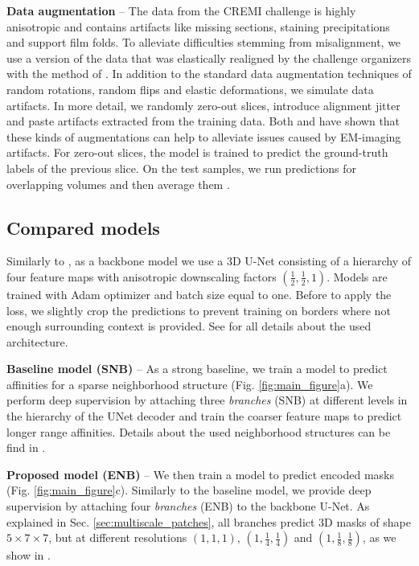 \textbf{Data augmentation} -- The data from the CREMI challenge is highly \linebreak anisotropic and contains artifacts like missing sections, staining precipitations and support film folds. 
To alleviate difficulties stemming from misalignment, we use a version of the data that was elastically realigned by the challenge organizers with the method of \cite{saalfeld2012elastic}.
In addition to the standard data augmentation techniques of random rotations, random flips and  elastic deformations, we simulate data artifacts.
In more detail, we randomly zero-out slices, introduce alignment jitter and paste artifacts extracted from the training data. Both \cite{funke2018large} and \cite{lee2017superhuman} have shown
that these kinds of augmentations can help to alleviate issues caused by EM-imaging artifacts. For zero-out slices, the model is trained to predict the ground-truth labels of the previous slice.
On the test samples, we run predictions for overlapping volumes and then average them .


 
 


\subsection{Compared models}
Similarly to \cite{lee2019learning,lee2017superhuman,wolf2018mutex}, as a backbone model we use a 3D U-Net consisting of a hierarchy of four feature maps with anisotropic downscaling factors $(\frac{1}{2},\frac{1}{2},1)$. 
Models are trained with Adam optimizer and batch size equal to one. Before to apply the loss, we slightly crop the predictions to prevent training on borders where not enough surrounding context is provided. 
See  for all details about the used architecture. 

 
\textbf{Baseline model (SNB)} -- As a strong baseline, we train a model to predict affinities for a sparse neighborhood structure (Fig. \ref{fig:main_figure}a). We perform deep supervision by attaching three \emph{\sparseBr branches} (SNB) at different levels in the hierarchy of the UNet decoder and train the coarser feature maps to predict longer range affinities. Details about the used neighborhood structures can be find in .

\textbf{Proposed model (ENB)} -- We then train a model to predict encoded \maskname masks (Fig. \ref{fig:main_figure}c). Similarly to the baseline model, we provide deep supervision by attaching four \emph{\encBr branches} (ENB) to the backbone U-Net. As explained in Sec. \ref{sec:multiscale_patches}, all branches predict 3D masks of shape $5 \times 7 \times 7$, but at different resolutions $(1,1,1)$, $(1,\frac{1}{4},\frac{1}{4})$ and $(1,\frac{1}{8},\frac{1}{8})$, as we show in .

